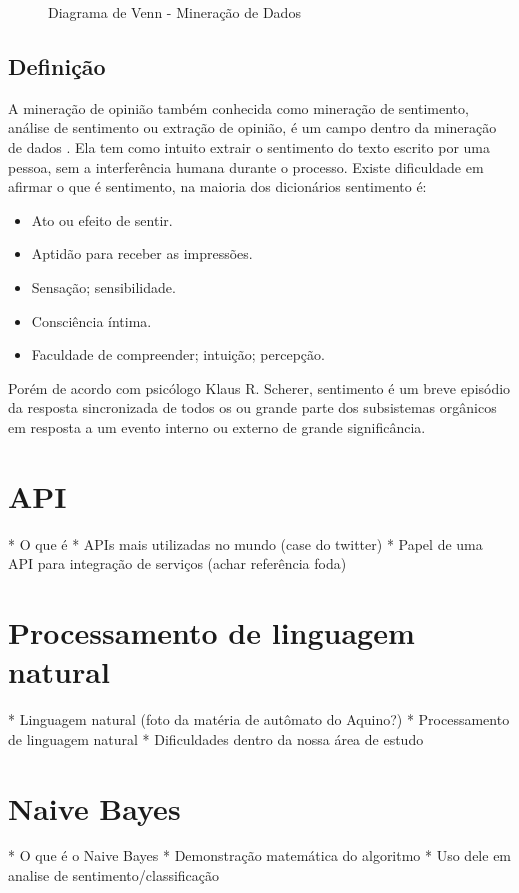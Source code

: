 \begin{figure}[ht]
	\centering{}
	\caption{Diagrama de Venn - Mineração de Dados}
	\label{uni}
\end{figure}


\subsection{Definição}
A mineração de opinião também conhecida como mineração de sentimento, análise de sentimento ou extração de opinião, é um campo dentro da mineração de dados \cite{santos2014mineraccao}. Ela tem como intuito extrair o sentimento do texto escrito por uma pessoa, sem a interferência humana durante o processo. Existe dificuldade em afirmar o que é sentimento, na maioria dos dicionários sentimento é:
\begin{itemize}
\item Ato ou efeito de sentir.
\item Aptidão para receber as impressões.
\item Sensação; sensibilidade.
\item Consciência íntima.
\item Faculdade de compreender; intuição; percepção.
\end{itemize}

Porém de acordo com psicólogo Klaus R. Scherer, sentimento é um breve episódio da resposta sincronizada de todos os ou grande parte dos subsistemas orgânicos em resposta a um evento interno ou externo de grande significância. \cite{scherer2001emotional}

\section{API}\label{sec:api}
* O que é
* APIs mais utilizadas no mundo (case do twitter)
* Papel de uma API para integração de serviços (achar referência foda)

\section{Processamento de linguagem natural}\label{sec:nlp}
* Linguagem natural (foto da matéria de autômato do Aquino?)
* Processamento de linguagem natural
* Dificuldades dentro da nossa área de estudo


\section{Naive Bayes}\label{sec:naive_bayes}
* O que é o Naive Bayes
* Demonstração matemática do algoritmo
* Uso dele em analise de sentimento/classificação


